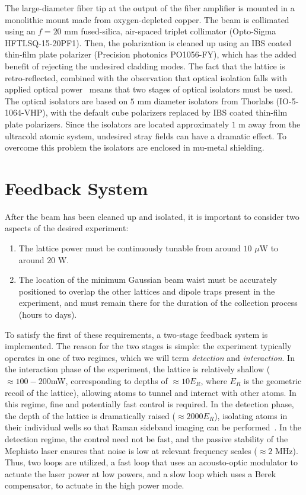 \documentclass[twocolumn,aps,pra,showpacs,preprintnumbers,bibnotes]{revtex4-1}
\begin{document}
The large-diameter fiber tip at the output of the fiber amplifier is mounted in a monolithic mount made from oxygen-depleted copper.
The beam is collimated using an $f=20$ mm fused-silica, air-spaced triplet collimator (Opto-Sigma HFTLSQ-15-20PF1).
Then, the polarization is cleaned up using an IBS coated thin-film plate polarizer (Precision photonics PO1056-FY), which has the added benefit of rejecting the undesired cladding modes. 
The fact that the lattice is retro-reflected, combined with the observation that optical isolation falls with applied optical power~\cite{Yoshida1999} means that two stages of optical isolators must be used. 
The optical isolators are based on $5$ mm diameter isolators from Thorlabs (IO-5-1064-VHP), with the default cube polarizers replaced by IBS coated thin-film plate polarizers. 
Since the isolators are located approximately $1$ m away from the ultracold atomic system, undesired stray fields can have a dramatic effect.
To overcome this problem the isolators are enclosed in mu-metal shielding.

\section{Feedback System}

After the beam has been cleaned up and isolated, it is important to consider two aspects of the desired experiment: 
\begin{enumerate}
\item The lattice power must be continuously tunable from around $10$ $\mu$W to around $20$ W. 
\item The location of the minimum Gaussian beam waist must be accurately positioned to overlap the other lattices and dipole traps present in the experiment, and must remain there for the duration of the collection process (hours to days).
\end{enumerate}
To satisfy the first of these requirements, a two-stage feedback system is implemented. The reason for the two stages is simple: the experiment typically operates in one of two regimes, which we will term \textit{detection} and \textit{interaction}. 
In the interaction phase of the experiment, the lattice is relatively shallow ($\approx 100-200$mW, corresponding to depths of $\approx 10 E_R$, where $E_R$ is the geometric recoil of the lattice), allowing atoms to tunnel and interact with other atoms. 
In this regime, fine and potentially fast control is required.
In the detection phase, the depth of the lattice is dramatically raised ($\approx 2000 E_R$), isolating atoms in their individual wells so that Raman sideband imaging can be performed~\cite{Parsons2015}.
In the detection regime, the control need not be fast, and the passive stability of the Mephisto laser ensures that noise is low at relevant frequency scales ($\approx 2$ MHz).
Thus, two loops are utilized, a fast loop that uses an acousto-optic modulator to actuate the laser power at low powers, and a slow loop which uses a Berek compensator, to actuate in the high power mode.
\end{document}
